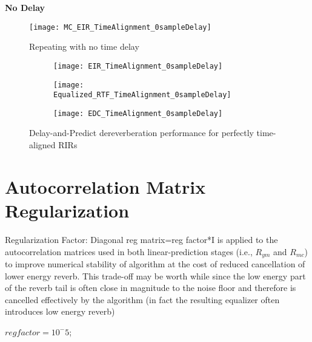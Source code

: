 \textbf{No Delay}

\begin{figure}[H]
	\texttt{[image: MC\_EIR\_TimeAlignment\_0sampleDelay]}
	\centering
	\caption{Repeating with no time delay}
	\label{fig:params_MC_EIR_TimeAlignment_0sampleDelay}
\end{figure}

\begin{figure}[H]
	\centering
	\begin{subfigure}[b]{0.32\textwidth}
		\centering
		\texttt{[image: EIR\_TimeAlignment\_0sampleDelay]}
	\end{subfigure}
	\hfill
	\begin{subfigure}[b]{0.32\textwidth}
		\centering
		\texttt{[image: Equalized\_RTF\_TimeAlignment\_0sampleDelay]}
	\end{subfigure}
	\hfill
	\begin{subfigure}[b]{0.32\textwidth}
		\centering
		\texttt{[image: EDC\_TimeAlignment\_0sampleDelay]}
	\end{subfigure}
	\hfill
	\caption{Delay-and-Predict dereverberation performance for perfectly time-aligned RIRs}
	\label{fig:params_TimeAlignment_0sampleDelay}
\end{figure}


\section{Autocorrelation Matrix Regularization}

 Regularization Factor: Diagonal reg matrix=reg factor*I is applied to the autocorrelation matrices used in both linear-prediction stages (i.e., $R_{ym}$ and $R_{mc}$) to improve numerical stability of algorithm at the cost of reduced cancellation of lower energy reverb. This trade-off may be worth while since the low energy part of the reverb tail is often close in magnitude to the noise floor and therefore is cancelled effectively by the algorithm (in fact the resulting equalizer often introduces low energy reverb)
 
 $reg factor = 10^-5$;
 
